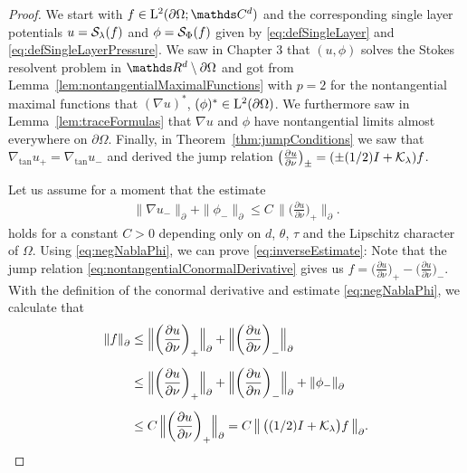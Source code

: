 \begin{proof}
  We start with $f \in \Ell^2(\partial\Omega; \C^d)$ and the corresponding single layer potentials $u = \mathcal{S}_\lambda(f)$ and $\phi = \mathcal{S}_\Phi(f)$ given by \eqref{eq:defSingleLayer} and \eqref{eq:defSingleLayerPressure}.
  We saw in Chapter 3 that $(u,\phi)$ solves the Stokes resolvent problem in $\R^d \setminus \partial\Omega$ and got from Lemma~\ref{lem:nontangentialMaximalFunctions} with $p = 2$ for the nontangential maximal functions that $(\nabla u)^*$, $(\phi)^* \in \mathrm{L}^2(\partial\Omega)$.
  We furthermore saw in Lemma~\ref{lem:traceFormulas} that $\nabla u$ and $\phi$ have nontangential limits almost everywhere on $\partial\Omega$. 
  Finally, in Theorem~\ref{thm:jumpConditions} we saw that $\nabla_{\mathrm{tan}} u_+ = \nabla_{\mathrm{tan}} u_-$ and derived the jump relation $\big(\frac{\partial u}{\partial \nu}\big)_\pm = (\pm (1/2) I + \mathcal{K}_\lambda) f$.

  Let us assume for a moment that the estimate
  \begin{align}
    \label{eq:negNablaPhi}
    \| \nabla u_- \|^{}_\partial + \| \phi_- \|^{}_\partial \leq C \, \Big\| \bigg( \frac{\partial u}{\partial \nu} \bigg)_+ \Big\|^{}_\partial .
  \end{align}
  holds for a constant $C > 0$ depending only on $d$, $\theta$, $\tau$ and the Lipschitz character of $\Omega$. 
  Using \eqref{eq:negNablaPhi}, we can prove \eqref{eq:inverseEstimate}:
  Note that the jump relation \eqref{eq:nontangentialConormalDerivative} gives us $f = \big(\frac{\partial u}{\partial \nu} \big)_+ -  \big( \frac{\partial u}{\partial \nu} \big)_-$.
  With the definition of the conormal derivative and estimate \eqref{eq:negNablaPhi}, we calculate that
  \begin{align*}
    \| f\|^{}_\partial 
    &\leq  \Big\|    \bigg( \frac{\partial u}{\partial \nu} \bigg)_+ \Big\|^{}_\partial + \Big\|  \bigg( \frac{\partial u}{\partial \nu} \bigg)_- \Big\|^{}_\partial  \\[0.5em]
    &\leq \Big\|     \bigg( \frac{\partial u}{\partial \nu} \bigg)_+  \Big\|^{}_\partial + \Big\| \bigg( \frac{\partial u}{\partial n}   \bigg)_- \Big\|^{}_\partial + \| \phi_- \|^{}_\partial  \\[0.5em]
    &\leq C\, \Big\| \bigg( \frac{\partial u}{\partial \nu} \bigg)_+ \Big\|^{}_\partial
    = C\, \big\| \, \big((1/2)I + \mathcal{K}_\lambda\big) f\, \big\|^{}_\partial.
  \end{align*}


\end{proof}

